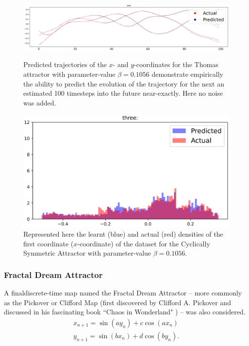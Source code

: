 \begin{figure}[ht]
  \centering
  \includegraphics[scale=0.35]{Graphs/_Thomas_1.eps}\caption*{Predicted trajectories of the $x$- and $y$-coordinates for the Thomas attractor with parameter-value $\beta=0.1056$ demonstrate empirically the ability to predict the evolution of the trajectory for the next an estimated 100 timesteps into the future near-exactly. Here no noise was added.}
  \includegraphics[scale=0.5]{Graphs/_Thomas_3.eps}\caption*{Represented here the learnt (blue) and actual (red) densities of the first coordinate ($x$-coordinate) of the dataset for the Cyclically Symmetric Attractor with parameter-value $\beta=0.1056$.}
\end{figure}\label{fig:Thomas_TrajDensity}


\subsubsection{Fractal Dream Attractor}

A finaldiscrete-time map named the Fractal Dream Attractor -- more commonly as the Pickover or Clifford Map (first discovered by Clifford A. Pickover and discussed in his fascinating book ``Chaos in Wonderland" \cite{PickoverChaos}) -- was also considered.
\begin{eqnarray}\label{eqns_clifford}
  {x_{n+1}=\sin(ay_n) + c\cos(ax_n)} \\
  {y_{n+1}=\sin(bx_n)+d\cos(by_n)}.
\end{eqnarray}


